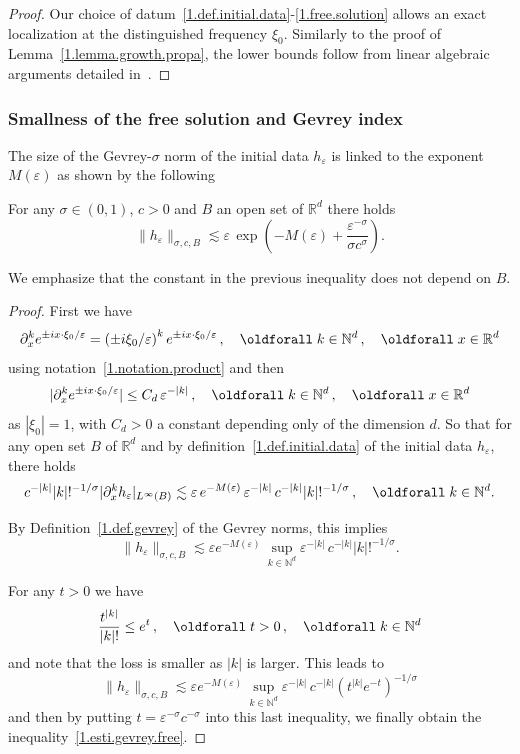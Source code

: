\documentclass[AHL,Unicode,longabstracts,published]{cedram}
\theoremstyle{plain}
\newcommand*\e{\varepsilon}
\newcommand*\R{{\mathbb R}}
\newcommand*\N{{\mathbb N}}
\newcommand{\dptl}{\partial}%
\newcommand*\dsp{\displaystyle}
\renewcommand*{\forall}{\mathrel{\oldforall}}
\begin{document}
\begin{proof}
Our choice of datum~\eqref{1.def.initial.data}-\eqref{1.free.solution} allows an exact localization at the distinguished frequency $\xi_0$. Similarly to the proof of Lemma~\ref{1.lemma.growth.propa}, the lower bounds follow from linear algebraic arguments detailed in~\cite{lerner2015onset}.
\end{proof}


\subsubsection{Smallness of the free solution and Gevrey index}


The size of the Gevrey-$\sigma$ norm of the initial data $h_{\e}$ is linked to the exponent $M(\e)$ as shown by the following

\begin{lemm}\label{1.size.gevrey.exp}
For any $\sigma\in(0,1)$, $c>0$ and $B$ an open set of $\R^{d}$ there holds
\begin{equation}\label{1.esti.gevrey.free}
\dsp \|h_{\e}\|_{\sigma,c,B} \lesssim \e\,\exp\left(- M(\e) + \frac{\e^{-\sigma}}{\sigma c^{\sigma}}\right).
\end{equation}


We emphasize that the constant in the previous inequality does not depend on $B$.
\end{lemm}

\begin{proof}
First we have
\[
\dsp \dptl_{x}^{k} e^{\pm ix\cdot\xi_{0}/\e} = \left(\pm i\xi_{0}/\e\right)^{k}e^{\pm ix\cdot\xi_{0}/\e} \,,\quad \forall k\in\N^{d} \,,\quad \forall x\in\R^{d}
\]
using notation~\eqref{1.notation.product} and then
\[
\dsp |\dptl_{x}^{k} e^{\pm ix\cdot\xi_{0}/\e}| \leq C_d \, \e^{-|k|} \,,\quad \forall k\in\N^{d} \,,\quad \forall x\in\R^{d}
\]
as $|\xi_{0}| = 1$, with $C_d>0$ a constant depending only of the dimension $d$. So that for any open set $B$ of $\R^{d}$ and by definition~\eqref{1.def.initial.data} of the initial data $h_{\e}$, there holds
\[
\dsp c^{-|k|}|k|!^{-1/\sigma} |\dptl_{x}^{k} h_{\e} |_{L^{\infty}(B)} \lesssim \e\, e^{-M(\e)} \,\e^{-|k|}\,c^{-|k|} |k|!^{-1/\sigma} \,,\quad \forall k\in\N^{d}.
\]


By Definition~\ref{1.def.gevrey} of the Gevrey norms, this implies
\[
\dsp \|h_{\e}\|_{\sigma,c,B} \lesssim \e e^{-M(\e)} \, \sup_{k\in\N^{d}} \e^{-|k|}\,c^{-|k|} |k|!^{-1/\sigma}.
\]


For any $t>0$ we have
\[
\frac{t^{|k|}}{|k|!} \leq e^{t}\,, \quad \forall t>0 \,, \quad \forall k\in\N^{d}
\]
and note that the loss is smaller as $|k|$ is larger. This leads to
\[
\|h_{\e}\|_{\sigma,c,B} \lesssim \e e^{-M(\e)} \, \sup_{k\in\N^{d}} \e^{-|k|}\,c^{-|k|} \left(t^{|k|}e^{-t}\right)^{-1/\sigma}
\]
and then by putting $t = \e^{-\sigma}c^{-\sigma}$ into this last inequality, we finally obtain the inequality~\eqref{1.esti.gevrey.free}.
\end{proof}
\end{document}
